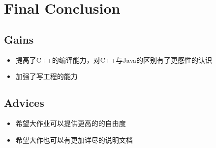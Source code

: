 \chapter{Final Conclusion}
\section{Gains}

\begin{itemize}
\item 提高了C++的编译能力，对C++与Java的区别有了更感性的认识
\item 加强了写工程的能力
\end{itemize}

\section{Advices}

\begin{itemize}
\item 希望大作业可以提供更高的的自由度
\item 希望大作也可以有更加详尽的说明文档
\end{itemize}
